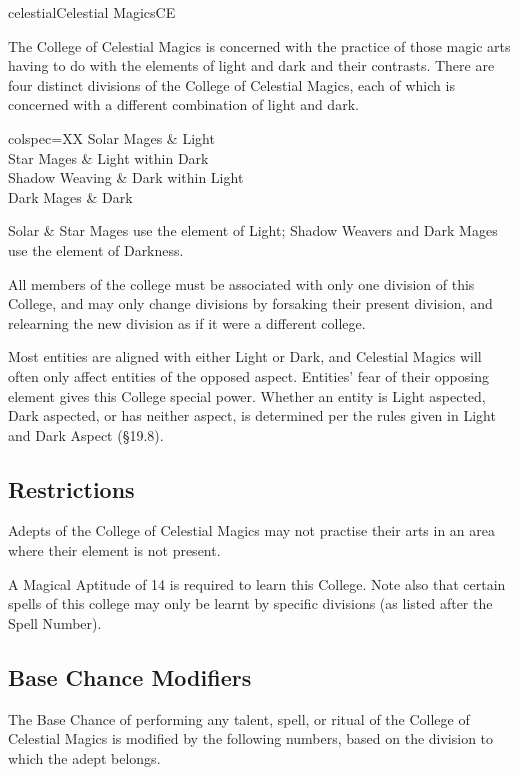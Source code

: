 \begin{College}[1.3]{celestial}{Celestial Magics}{CE}

The College of Celestial Magics is concerned with the practice of
those magic arts having to do with the elements of light and dark and
their contrasts.  There are four distinct divisions of the College of
Celestial Magics, each of which is concerned with a different
combination of light and dark.

\begin{dqtblr}{colspec={XX}}
Solar Mages	& Light \\
Star Mages	& Light within Dark \\
Shadow Weaving	& Dark within Light \\
Dark Mages	& Dark  \\
\end{dqtblr}

Solar \& Star Mages use the element of Light; Shadow Weavers and Dark
Mages use the element of Darkness.

All members of the college must be associated with only one division
of this College, and may only change divisions by forsaking their
present division, and relearning the new division as if it were a
different college.

Most entities are aligned with either Light or Dark, and Celestial
Magics will often only affect entities of the opposed aspect.
Entities’ fear of their opposing element gives this College special
power.  Whether an entity is Light aspected, Dark aspected, or has
neither aspect, is determined per the rules given in Light and Dark
Aspect (§19.8).

\subsection{Restrictions}

Adepts of the College of Celestial Magics may not practise their arts
in an area where their element is not present.

A Magical Aptitude of 14 is required to learn this College. Note also
that certain spells of this college may only be learnt by specific
divisions (as listed after the Spell Number).

\subsection{Base Chance Modifiers}

The Base Chance of performing any talent, spell, or ritual of the
College of Celestial Magics is modified by the following numbers,
based on the division to which the adept belongs.


\end{College}
